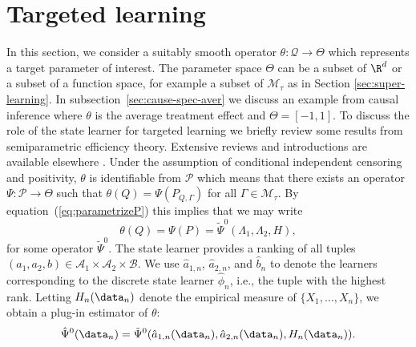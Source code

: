\section{Targeted learning}
\label{sec:targeted-learning}

In this section, we consider a suitably smooth operator
\( \theta \colon \mathcal{Q} \rightarrow \Theta \) which represents a
target parameter of interest. The parameter space $\Theta$ can be a
subset of \(\R^d\) or a subset of a function space, for example a
subset of \(\mathcal{M}_{\tau}\) as in Section
\ref{sec:super-learning}. In subsection~\ref{sec:cause-spec-aver} we
discuss an example from causal inference where $\theta$ is the average
treatment effect and \( \Theta = [-1,1] \).  To discuss the role of
the state learner for targeted learning we briefly review some results
from semiparametric efficiency theory. Extensive reviews and
introductions are available elsewhere
\cite[e.g.,][]{pfanzagl1985contributions,bickel1993efficient,van2003unified,tsiatis2007semiparametric,kennedy2016semiparametric}.
Under the assumption of conditional independent censoring and
positivity, $\theta$ is identifiable from \( \mathcal{P} \) which
means that there exists an operator
\( \Psi \colon \mathcal{P} \rightarrow \Theta \) such that
\( \theta(Q) = \Psi(P_{Q, \Gamma}) \) for all
$\Gamma \in \mathcal{M}_{\tau}$.  By equation~(\ref{eq:parametrizeP})
this implies that we may write
\begin{equation*}
  \theta(Q) = \Psi(P) = \tilde{\Psi}^0(\Lambda_1, \Lambda_2, H),
\end{equation*}
for some operator \( \tilde{\Psi}^0 \). The state learner provides a ranking of
all tuples
\( (a_1, a_2, b) \in \mathcal{A}_1 \times \mathcal{A}_2 \times \mathcal{B} \).
We use \( \hat{a}_{1,n} \), \( \hat{a}_{2,n} \), and \( \hat{b}_n \) to denote
the learners corresponding to the discrete state learner \( \hat{\phi}_n \),
i.e., the tuple with the highest rank. Letting \( H_n(\data_n) \) denote the
empirical measure of \( \{X_1, \dots, X_n\} \), we obtain a plug-in estimator of
$\theta$:
\begin{equation}
  \label{eq:2}
  \hat{\Psi}^0(\data_n) =
  \tilde{\Psi}^0(\hat{a}_{1,n}(\data_n), \hat{a}_{2,n}(\data_n), H_n(\data_n)). 
\end{equation}

